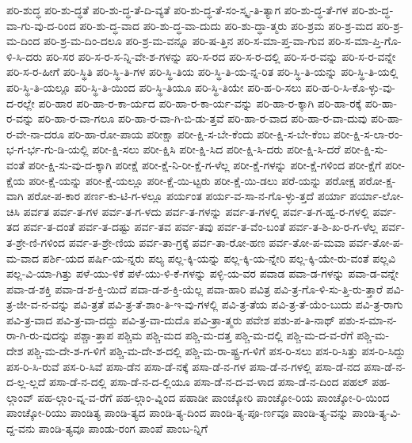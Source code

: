 {ಪರಿ-ಶುದ್ಧ
ಪರಿ-ಶು-ದ್ಧತೆ
ಪರಿ-ಶು-ದ್ಧ-ತೆ-ದಿ-ವ್ಯತೆ
ಪರಿ-ಶು-ದ್ಧ-ತೆ-ಸಂ-ಸ್ಕೃ-ತಿ-ತ್ಯಾಗ
ಪರಿ-ಶು-ದ್ಧ-ತೆ-ಗಳ
ಪರಿ-ಶು-ದ್ಧ-ವಾ-ಗು-ವು-ದ-ರಿಂದ
ಪರಿ-ಶು-ದ್ಧ-ವಾದ
ಪರಿ-ಶು-ದ್ಧ-ವಾ-ದುದು
ಪರಿ-ಶು-ದ್ಧಾ-ತ್ಮರು
ಪರಿ-ಶ್ರಮ
ಪರಿ-ಶ್ರ-ಮದ
ಪರಿ-ಶ್ರ-ಮ-ದಿಂದ
ಪರಿ-ಶ್ರ-ಮ-ದಿಂ-ದಲೂ
ಪರಿ-ಶ್ರ-ಮ-ವನ್ನೂ
ಪರಿ-ಷ-ತ್ತಿನ
ಪರಿ-ಸ-ಮಾ-ಪ್ತ-ವಾ-ಗುವ
ಪರಿ-ಸ-ಮಾ-ಪ್ತಿ-ಗೊ-ಳಿ-ಸಿ-ದರು
ಪರಿ-ಸರ
ಪರಿ-ಸ-ರ-ಸ-ನ್ನಿ-ವೇ-ಶ-ಗಳನ್ನು
ಪರಿ-ಸ-ರದ
ಪರಿ-ಸ-ರ-ದಲ್ಲಿ
ಪರಿ-ಸ-ರ-ವನ್ನು
ಪರಿ-ಸ-ರ-ವನ್ನೇ
ಪರಿ-ಸ-ರ-ಹೀಗೆ
ಪರಿ-ಸ್ಥಿತಿ
ಪರಿ-ಸ್ಥಿ-ತಿ-ಗಳ
ಪರಿ-ಸ್ಥಿ-ತಿಯ
ಪರಿ-ಸ್ಥಿ-ತಿ-ಯ-ನ್ನ-ರಿತ
ಪರಿ-ಸ್ಥಿ-ತಿ-ಯನ್ನು
ಪರಿ-ಸ್ಥಿ-ತಿ-ಯಲ್ಲಿ
ಪರಿ-ಸ್ಥಿ-ತಿ-ಯಲ್ಲೂ
ಪರಿ-ಸ್ಥಿ-ತಿ-ಯಿಂದ
ಪರಿ-ಸ್ಥಿ-ತಿಯೂ
ಪರಿ-ಸ್ಥಿ-ತಿಯೇ
ಪರಿ-ಹ-ರಿ-ಸಲು
ಪರಿ-ಹ-ರಿ-ಸಿ-ಕೊ-ಳ್ಳು-ವು-ದ-ರಲ್ಲೇ
ಪರಿ-ಹಾರ
ಪರಿ-ಹಾ-ರ-ಕಾ-ರ್ಯದ
ಪರಿ-ಹಾ-ರ-ಕಾ-ರ್ಯ-ವನ್ನು
ಪರಿ-ಹಾ-ರ-ಕ್ಕಾಗಿ
ಪರಿ-ಹಾ-ರಕ್ಕೆ
ಪರಿ-ಹಾ-ರ-ವನ್ನು
ಪರಿ-ಹಾ-ರ-ವಾ-ಗಲೂ
ಪರಿ-ಹಾ-ರ-ವಾ-ಗಿ-ಬಿ-ಡು-ತ್ತವೆ
ಪರಿ-ಹಾ-ರ-ವಾದ
ಪರಿ-ಹಾ-ರ-ವಾ-ದುವು
ಪರಿ-ಹಾ-ರ-ವೇ-ನಾ-ದರೂ
ಪರಿ-ಹಾ-ರೋ-ಪಾಯ
ಪರೀಕ್ಷಾ
ಪರೀ-ಕ್ಷಿ-ಸ-ಬೇ-ಕೆಂದು
ಪರೀ-ಕ್ಷಿ-ಸ-ಬೇ-ಕೆಂಬ
ಪರೀ-ಕ್ಷಿ-ಸ-ಲಾ-ರಂ-ಭ-ಗ-ರ್ಭ-ಗು-ಡಿ-ಯಲ್ಲಿ
ಪರೀ-ಕ್ಷಿ-ಸಲು
ಪರೀ-ಕ್ಷಿಸಿ
ಪರೀ-ಕ್ಷಿ-ಸಿದ
ಪರೀ-ಕ್ಷಿ-ಸಿ-ದರು
ಪರೀ-ಕ್ಷಿ-ಸಿ-ದರೆ
ಪರೀ-ಕ್ಷಿ-ಸು-ವಂತೆ
ಪರೀ-ಕ್ಷಿ-ಸು-ವು-ದ-ಕ್ಕಾಗಿ
ಪರೀಕ್ಷೆ
ಪರೀ-ಕ್ಷೆ-ನಿ-ರೀ-ಕ್ಷೆ-ಗ-ಳೆಲ್ಲ
ಪರೀ-ಕ್ಷೆ-ಗಳನ್ನು
ಪರೀ-ಕ್ಷೆ-ಗಳಿಂದ
ಪರೀ-ಕ್ಷೆಗೆ
ಪರೀ-ಕ್ಷೆಯ
ಪರೀ-ಕ್ಷೆ-ಯನ್ನು
ಪರೀ-ಕ್ಷೆ-ಯಲ್ಲೂ
ಪರೀ-ಕ್ಷೆ-ಯಿ-ಟ್ಟರು
ಪರೀ-ಕ್ಷೆ-ಯಿ-ಡಲು
ಪರೆ-ಯನ್ನು
ಪರೋಕ್ಷ
ಪರೋ-ಕ್ಷ-ವಾಗಿ
ಪರೋ-ಪ-ಕಾರ
ಪರ್ಣ-ಕು-ಟಿ-ಗ-ಳಲ್ಲೂ
ಪರ್ಯಂತ
ಪರ್ಯ-ವ-ಸಾ-ನ-ಗೊ-ಳ್ಳು-ತ್ತದೆ
ಪರ್ಯಾ
ಪರ್ಯಾ-ಲೋ-ಚಿಸಿ
ಪರ್ವತ
ಪರ್ವ-ತ-ಗಳ
ಪರ್ವ-ತ-ಗ-ಳದು
ಪರ್ವ-ತ-ಗಳನ್ನು
ಪರ್ವ-ತ-ಗಳಲ್ಲಿ
ಪರ್ವ-ತ-ಗ-ಹ್ವ-ರ-ಗಳಲ್ಲಿ
ಪರ್ವ-ತದ
ಪರ್ವ-ತ-ದಂತೆ
ಪರ್ವ-ತ-ದಷ್ಟು
ಪರ್ವ-ತವ
ಪರ್ವ-ತವು
ಪರ್ವ-ತ-ವೆಂ-ಬಂತೆ
ಪರ್ವ-ತ-ಶಿ-ಖ-ರ-ಗ-ಳೆಲ್ಲ
ಪರ್ವ-ತ-ಶ್ರೇ-ಣಿ-ಗಳಿಂದ
ಪರ್ವ-ತ-ಶ್ರೇ-ಣಿಯ
ಪರ್ವ-ತಾ-ಗ್ರಕ್ಕೆ
ಪರ್ವ-ತಾ-ರೋ-ಹಣ
ಪರ್ವ-ತೋ-ಪ-ಮವಾ
ಪರ್ವ-ತೋ-ಪ-ಮ-ವಾದ
ಪರ್ಶಿ-ಯದ
ಪರ್ಷಿ-ಯ-ನ್ನರು
ಪಲ್ಯ
ಪಲ್ಲ-ಕ್ಕಿ-ಯನ್ನು
ಪಲ್ಲ-ಕ್ಕಿ-ಯ-ನ್ನೇರಿ
ಪಲ್ಲ-ಕ್ಕಿ-ಯೇ-ರು-ವಂತೆ
ಪಲ್ಲವಿ
ಪಲ್ಲ-ವಿ-ಯಾ-ಗಿತ್ತು
ಪಳೆ-ಯು-ಳಿಕೆ
ಪಳೆ-ಯು-ಳಿ-ಕೆ-ಗಳನ್ನು
ಪಳ್ಳಿ-ಯ-ವರ
ಪವಾಡ
ಪವಾ-ಡ-ಗಳನ್ನು
ಪವಾ-ಡ-ವನ್ನೇ
ಪವಾ-ಡ-ಶಕ್ತಿ
ಪವಾ-ಡ-ಶ-ಕ್ತಿ-ಯಿದೆ
ಪವಾ-ಡ-ಶ-ಕ್ತಿ-ಯೆಲ್ಲ
ಪವಾ-ಹಾರಿ
ಪವಿತ್ರ
ಪವಿ-ತ್ರ-ಗೊ-ಳಿ-ಸು-ತ್ತಿ-ರು-ತ್ತಾರೆ
ಪವಿ-ತ್ರ-ಜೀ-ವ-ನ-ವನ್ನು
ಪವಿ-ತ್ರತೆ
ಪವಿ-ತ್ರ-ತೆ-ಶಾಂ-ತಿ-ಇ-ವು-ಗಳಲ್ಲಿ
ಪವಿ-ತ್ರ-ತೆಯ
ಪವಿ-ತ್ರ-ತೆ-ಯೆಂ-ಬುದು
ಪವಿ-ತ್ರ-ರಾಗು
ಪವಿ-ತ್ರ-ವಾದ
ಪವಿ-ತ್ರ-ವಾ-ದದ್ದು
ಪವಿ-ತ್ರ-ವಾ-ದುದೊ
ಪವಿ-ತ್ರಾ-ತ್ಮರು
ಪವೇಶ
ಪಶು-ಪ-ತಿ-ನಾಥ್
ಪಶು-ಸ-ಮಾ-ನ-ರಾ-ಗಿ-ರು-ವುದನ್ನು
ಪಶ್ಚಾ-ತ್ತಾಪ
ಪಶ್ಚಿಮ
ಪಶ್ಚಿ-ಮದ
ಪಶ್ಚಿ-ಮ-ದತ್ತ
ಪಶ್ಚಿ-ಮ-ದಲ್ಲಿ
ಪಶ್ಚಿ-ಮ-ದ-ವ-ರೆಗೆ
ಪಶ್ಚಿ-ಮ-ದೇಶ
ಪಶ್ಚಿ-ಮ-ದೇ-ಶ-ಗ-ಳಿಗೆ
ಪಶ್ಚಿ-ಮ-ದೇ-ಶ-ದಲ್ಲಿ
ಪಶ್ಚಿ-ಮ-ರಾ-ಷ್ಟ್ರ-ಗ-ಳಿಗೆ
ಪಸ-ರಿ-ಸಲು
ಪಸ-ರಿ-ಸಿತ್ತು
ಪಸ-ರಿ-ಸಿದ್ದು
ಪಸ-ರಿ-ಸಿ-ರುವೆ
ಪಸ-ರಿ-ಸಿವೆ
ಪಸಾ-ಡೆನ
ಪಸಾ-ಡೆ-ನಕ್ಕೆ
ಪಸಾ-ಡೆ-ನ-ಗಳ
ಪಸಾ-ಡೆ-ನ-ಗಳಲ್ಲಿ
ಪಸಾ-ಡೆ-ನದ
ಪಸಾ-ಡೆ-ನ-ದ-ಲ್ಲ-ಲ್ಲದೆ
ಪಸಾ-ಡೆ-ನ-ದಲ್ಲಿ
ಪಸಾ-ಡೆ-ನ-ದ-ಲ್ಲಿಯೂ
ಪಸಾ-ಡೆ-ನ-ದ-ವ-ಳಾದ
ಪಸಾ-ಡೆ-ನ-ದಿಂದ
ಪಹಲ್
ಪಹ-ಲ್ಗಾಂವ್
ಪಹ-ಲ್ಗಾಂ-ವ್ನ-ವ-ರೆಗೆ
ಪಹ-ಲ್ಗಾಂ-ವ್ನಿಂದ
ಪಹಾಡೀ
ಪಾಂಚ್ಕೋರಿ
ಪಾಂಚ್ಕೋ-ರಿಯ
ಪಾಂಚ್ಕೋ-ರಿ-ಯಿಂದ
ಪಾಂಚ್ಕೋ-ರಿಯು
ಪಾಂಡಿತ್ಯ
ಪಾಂಡಿ-ತ್ಯದ
ಪಾಂಡಿ-ತ್ಯ-ದಿಂದ
ಪಾಂಡಿ-ತ್ಯ-ಪೂ-ರ್ಣವೂ
ಪಾಂಡಿ-ತ್ಯ-ವನ್ನು
ಪಾಂಡಿ-ತ್ಯ-ವಿ-ದ್ದ-ವನು
ಪಾಂಡಿ-ತ್ಯವೂ
ಪಾಂಡು-ರಂಗ
ಪಾಂಪೆ
ಪಾಂಬ-ನ್ನಿಗೆ
}
